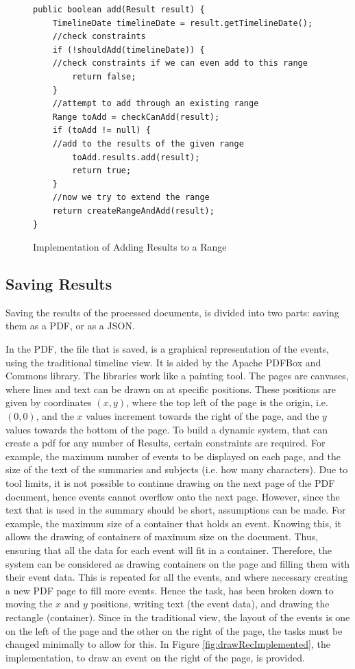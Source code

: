 \begin{figure}[H]
\begin{lstlisting}
public boolean add(Result result) {
    TimelineDate timelineDate = result.getTimelineDate();
    //check constraints
    if (!shouldAdd(timelineDate)) {
	//check constraints if we can even add to this range
        return false;
    }
    //attempt to add through an existing range
    Range toAdd = checkCanAdd(result);
    if (toAdd != null) {
	//add to the results of the given range
        toAdd.results.add(result);
        return true;
    }
    //now we try to extend the range
    return createRangeAndAdd(result);
}
\end{lstlisting}
\caption{Implementation of Adding Results to a Range}
\label{fig:addRangeImplementation}
\end{figure}

\subsection{Saving Results}
\par Saving the results of the processed documents, is divided into two parts: saving them as a PDF, or as a JSON. 

\par In the PDF, the file that is saved, is a graphical representation of the events, using the traditional timeline view. It is aided by the Apache PDFBox and Commons library. The libraries work like a painting tool. The pages are canvases, where lines and text can be drawn on at specific positions. These positions are given by coordinates $(x,y)$, where the top left of the page is the origin, i.e. $(0,0)$, and the $x$ values increment towards the right of the page, and the $y$ values towards the bottom of the page. To build a dynamic system, that can create a pdf for any number of Results, certain constraints are required. For example, the maximum number of events to be displayed on each page, and the size of the text of the summaries and subjects (i.e. how many characters). Due to tool limits, it is not possible to continue drawing on the next page of the PDF document, hence events cannot overflow onto the next page. However, since the text that is used in the summary should be short, assumptions can be made. For example, the maximum size of a container that holds an event. Knowing this, it allows the drawing of containers of maximum size on the document. Thus, ensuring that all the data for each event will fit in a container. Therefore, the system can be considered as drawing containers on the page and filling them with their event data. This is repeated for all the events, and where necessary creating a new PDF page to fill more events. Hence the task, has been broken down to moving the $x$ and $y$ positions, writing text (the event data), and drawing the rectangle (container). Since in the traditional view, the layout of the events is one on the left of the page and the other on the right of the page, the tasks must be changed minimally to allow for this. In Figure \ref{fig:drawRecImplemented}, the implementation, to draw an event on the right of the page, is provided.

